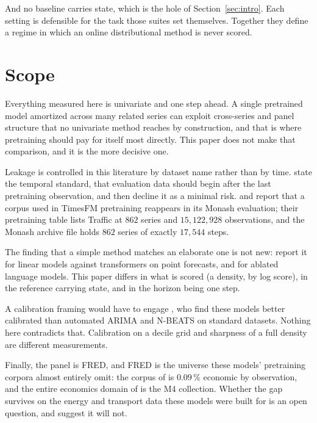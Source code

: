 \documentclass[article]{jss}
\providecommand{\proglang}[1]{\textsf{#1}}
\begin{document}
And no baseline carries state, which is the hole of Section~\ref{sec:intro}.
Each setting is defensible for the task those suites set themselves. Together
they define a regime in which an online distributional method is never scored.

\section{Scope}\label{sec:scope}

Everything measured here is univariate and one step ahead. A single pretrained
model amortized across many related series can exploit cross-series and panel
structure that no univariate method reaches by construction, and that is where
pretraining should pay for itself most directly. This paper does not make that
comparison, and it is the more decisive one.

Leakage is controlled in this literature by dataset name rather than by time.
\citet{ansari2024chronos} state the temporal standard, that evaluation data
should begin after the last pretraining observation, and then decline it as a
minimal risk. \citet{meyer2025leakage} and \citet{oreshkin2026simulation} report
that a corpus used in TimesFM pretraining reappears in its Monash evaluation;
their pretraining table lists Traffic at $862$ series and $15{,}122{,}928$
observations, and the Monash archive file \citep{zenodo-traffic-hourly} holds
$862$ series of exactly $17{,}544$ steps.

The finding that a simple method matches an elaborate one is not new:
\citet{zeng2023transformers} report it for linear models against transformers
on point forecasts, and \citet{tan2024useful} for ablated language models.
This paper differs in what is scored (a density, by log score), in the
reference carrying state, and in the horizon being one step.

A calibration framing would have to engage \citet{adler2026calibrated}, who find
these models better calibrated than automated ARIMA and N-BEATS on standard
datasets. Nothing here contradicts that. Calibration on a decile grid and
sharpness of a full density are different measurements.

Finally, the panel is \proglang{FRED}, and \proglang{FRED} is the universe these
models' pretraining corpora almost entirely omit: the corpus of
\citet{woo2024moirai} is $0.09\,\%$ economic by observation, and the entire
economics domain of \citet{aksu2024gifteval} is the M4 collection. Whether the
gap survives on the energy and transport data these models were built for is an
open question, and \citet{wang2026spectral} suggest it will not.
\end{document}
